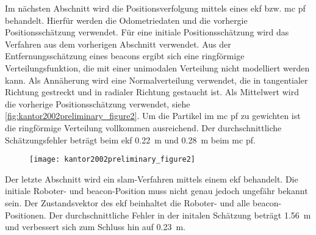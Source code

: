 Im nächsten Abschnitt wird die Positionsverfolgung mittels eines \Gls{ekf} bzw. \Gls{mc} \Gls{pf} behandelt. Hierfür werden die Odometriedaten und die vorhergie Positionsschätzung verwendet. Für eine initiale Positionsschätzung wird das Verfahren aus dem vorherigen Abschnitt verwendet. Aus der Entfernungsschätzung eines \Glspl{beacon} ergibt sich eine ringförmige Verteilungsfunktion, die mit einer unimodalen Verteilung nicht modelliert werden kann. Als Annäherung wird eine Normalverteilung verwendet, die in tangentialer Richtung gestreckt und in radialer Richtung gestaucht ist. Als Mittelwert wird die vorherige Positionsschätzung verwendet, siehe \autoref{fig:kantor2002preliminary_figure2}. Um die Partikel im \Gls{mc} \Gls{pf} zu gewichten ist die ringförmige Verteilung vollkommen ausreichend. Der durchschnittliche Schätzungsfehler beträgt beim \Gls{ekf} \SI{0.22}{\metre} und \SI{0.28}{\metre} beim \Gls{mc} \Gls{pf}.

\begin{figure}
	\centering
	\texttt{[image: kantor2002preliminary\_figure2]}
	\label{fig:kantor2002preliminary_figure2}
\end{figure}

Der letzte Abschnitt wird ein \Gls{slam}-Verfahren mittels einem \Gls{ekf} behandelt. Die initiale Roboter- und \Gls{beacon}-Position muss nicht genau jedoch ungefähr bekannt sein. Der Zustandsvektor des \Gls{ekf} beinhaltet die Roboter- und alle \Gls{beacon}-Positionen. Der durchschnittliche Fehler in der initalen Schätzung beträgt \SI{1.56}{\metre} und verbessert sich zum Schluss hin auf \SI{0.23}{\metre}.


%
%


%
%
